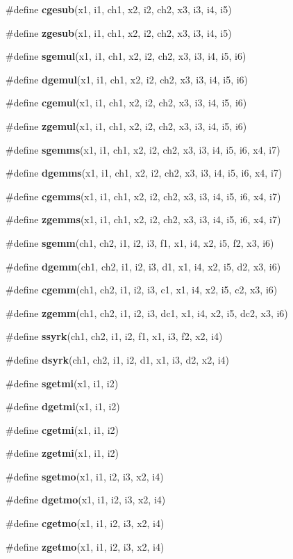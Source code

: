 \begin{CompactItemize}
\item 
\#define {\bf cgesub}(x1, i1, ch1, x2, i2, ch2, x3, i3, i4, i5)
\item 
\#define {\bf zgesub}(x1, i1, ch1, x2, i2, ch2, x3, i3, i4, i5)
\item 
\#define {\bf sgemul}(x1, i1, ch1, x2, i2, ch2, x3, i3, i4, i5, i6)
\item 
\#define {\bf dgemul}(x1, i1, ch1, x2, i2, ch2, x3, i3, i4, i5, i6)
\item 
\#define {\bf cgemul}(x1, i1, ch1, x2, i2, ch2, x3, i3, i4, i5, i6)
\item 
\#define {\bf zgemul}(x1, i1, ch1, x2, i2, ch2, x3, i3, i4, i5, i6)
\item 
\#define {\bf sgemms}(x1, i1, ch1, x2, i2, ch2, x3, i3, i4, i5, i6, x4, i7)
\item 
\#define {\bf dgemms}(x1, i1, ch1, x2, i2, ch2, x3, i3, i4, i5, i6, x4, i7)
\item 
\#define {\bf cgemms}(x1, i1, ch1, x2, i2, ch2, x3, i3, i4, i5, i6, x4, i7)
\item 
\#define {\bf zgemms}(x1, i1, ch1, x2, i2, ch2, x3, i3, i4, i5, i6, x4, i7)
\item 
\#define {\bf sgemm}(ch1, ch2, i1, i2, i3, f1, x1, i4, x2, i5, f2, x3, i6)
\item 
\#define {\bf dgemm}(ch1, ch2, i1, i2, i3, d1, x1, i4, x2, i5, d2, x3, i6)
\item 
\#define {\bf cgemm}(ch1, ch2, i1, i2, i3, c1, x1, i4, x2, i5, c2, x3, i6)
\item 
\#define {\bf zgemm}(ch1, ch2, i1, i2, i3, dc1, x1, i4, x2, i5, dc2, x3, i6)
\item 
\#define {\bf ssyrk}(ch1, ch2, i1, i2, f1, x1, i3, f2, x2, i4)
\item 
\#define {\bf dsyrk}(ch1, ch2, i1, i2, d1, x1, i3, d2, x2, i4)
\item 
\#define {\bf sgetmi}(x1, i1, i2)
\item 
\#define {\bf dgetmi}(x1, i1, i2)
\item 
\#define {\bf cgetmi}(x1, i1, i2)
\item 
\#define {\bf zgetmi}(x1, i1, i2)
\item 
\#define {\bf sgetmo}(x1, i1, i2, i3, x2, i4)
\item 
\#define {\bf dgetmo}(x1, i1, i2, i3, x2, i4)
\item 
\#define {\bf cgetmo}(x1, i1, i2, i3, x2, i4)
\item 
\#define {\bf zgetmo}(x1, i1, i2, i3, x2, i4)
\item 

\end{CompactItemize}
